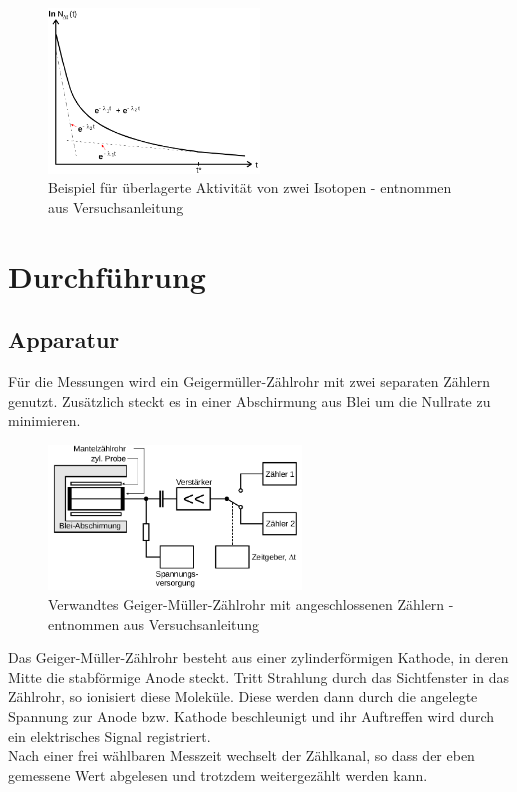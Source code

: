 \begin{figure}[h]
	\includegraphics[width=0.5\textwidth]{pics/zerfall.png}
	\caption{Beispiel für überlagerte Aktivität von zwei Isotopen - entnommen aus Versuchsanleitung}
\end{figure}

	\section{Durchführung}
	\subsection{Apparatur}
Für die Messungen wird ein Geigermüller-Zählrohr mit zwei separaten Zählern genutzt. Zusätzlich steckt es in einer Abschirmung aus Blei um die Nullrate zu minimieren.

\begin{figure}[h]
	\includegraphics[width=0.6\textwidth]{pics/geiger.png}
	\caption{Verwandtes Geiger-Müller-Zählrohr mit angeschlossenen Zählern - entnommen aus Versuchsanleitung}
\end{figure}
Das Geiger-Müller-Zählrohr besteht aus einer zylinderförmigen Kathode, in deren Mitte die stabförmige Anode steckt. Tritt Strahlung durch das Sichtfenster in das Zählrohr, so ionisiert diese Moleküle. Diese werden dann durch die angelegte Spannung zur Anode bzw. Kathode beschleunigt und ihr Auftreffen wird durch ein elektrisches Signal registriert.\\
Nach einer frei wählbaren Messzeit wechselt der Zählkanal, so dass der eben gemessene Wert abgelesen und trotzdem weitergezählt werden kann.


